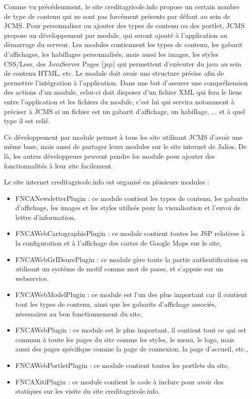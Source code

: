 \documentclass[12pt,a4paper]{article}
\begin{document}
\medskip
Comme vu précédemment, le site creditagricole.info propose un certain nombre de type de contenu qui ne sont pas forcément présents par défaut au sein de \gls{JCMS}. Pour personnaliser ou ajouter des types de contenu ou des portlet, \gls{JCMS} propose un développement par module, qui seront ajouté à l'application au démarrage du serveur. Les modules contiennent les types de contenu, les gabarit d'affichages, les habillages personnalisés, mais aussi les images, les styles CSS/Less, des JavaServer Pages (jsp) qui permettent d'exécuter du java au sein de contenu HTML, etc. Le module doit avoir une structure précise afin de permettre l'intégration à l'application. Dans une but d'assurer une compréhension des actions d'un module, celui-ci doit disposer d'un fichier XML qui fera le liens entre l'application et les fichiers du module, c'est lui qui servira notamment à préciser à \gls{JCMS} si un fichier est un gabarit d'affichage, un habillage, ... et à quel type il est relié.\par 
Ce développement par module permet à tous les site utilisant \gls{JCMS} d'avoir une même base, mais aussi de partager leurs modules sur le site internet de Jalios. De là, les autres développeurs peuvent pendre les module pour ajouter des fonctionnalités à leur site facilement.\par 
Le site internet creditagricole.info est organisé en plusieurs modules :
\begin{itemize}
\item FNCANewsletterPlugin : ce module contient les types de contenu, les gabarits d'affichage, les images et les styles utilisés pour la visualisation et l'envoi de lettre d'information,
\item FNCAWebCartographiePlugin : ce module contient toutes les JSP relatives à la configuration et à l'affichage des cartes de Google Maps sur le site,
\item FNCAWebGrIDsurePlugin : ce module gère toute la partie authentification en utilisant un système de motif comme mot de passe, et s'appuie sur un webservice.
\item FNCAWebModelPlugin : ce module est l'un des plus important car il contient tout les types de contenu, ainsi que les gabarits d'affichage associés, nécessaires au bon fonctionnement du site,
\item FNCAWebPlugin : ce module est le plus important, il contient tout ce qui est commun à toute les pages du site comme les styles, le menu, le logo, mais aussi des pages spécifique comme la page de connexion, la page d'accueil, etc.,
\item FNCAWebPortletPlugin : ce module contient toutes les portlets du site,
\item FNCAXitiPlugin : ce module contient le code à inclure pour avoir des statiques sur les visite du site creditagricole.info.
\end{itemize}\par
\end{document}
